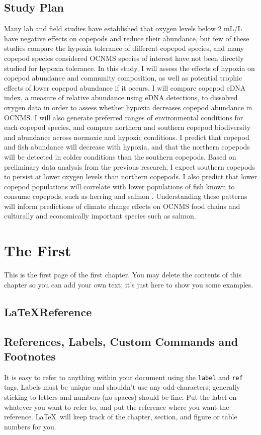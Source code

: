 \documentclass[12pt,twoside]{reedthesis}
\begin{document}
\clearpage 

\section{Study Plan}

Many lab and field studies have established that oxygen levels below 2 mL/L have negative effects on copepods and reduce their abundance, but few of these studies compare the hypoxia tolerance of different copepod species, and many copepod species considered OCNMS species of interest have not been directly studied for hypoxia tolerance. In this study, I will assess the effects of hypoxia on copepod abundance and community composition, as well as potential trophic effects of lower copepod abundance if it occurs. I will compare copepod eDNA index, a measure of relative abundance using eDNA detections, to dissolved oxygen data in order to assess whether hypoxia decreases copepod abundance in OCNMS. I will also generate preferred ranges of environmental conditions for each copepod species, and compare northern and southern copepod biodiversity and abundance across normoxic and hypoxic conditions. I predict that copepod and fish abundance will decrease with hypoxia, and that the northern copepods will be detected in colder conditions than the southern copepods. Based on preliminary data analysis from the previous research, I expect southern copepods to persist at lower oxygen levels than northern copepods. I also predict that lower copepod populations will correlate with lower populations of fish known to consume copepods, such as herring and salmon \autocite{Surma2022, Friedenberg2012, Brodeur1990}. Understanding these patterns will inform predictions of climate change effects on OCNMS food chains and culturally and economically important species such as salmon.
	
    \chapter{The First}
    	This is the first page of the first chapter. You may delete the contents of this chapter so you can add your own text; it's just here to show you some examples. 

   
   \section{\LaTeX Reference}
   
   \section{References, Labels, Custom Commands and Footnotes}
   It is easy to refer to anything within your document using the \texttt{label} and \texttt{ref} tags.  Labels must be unique and shouldn't use any odd characters; generally sticking to letters and numbers (no spaces) should be fine. Put the label on whatever you want to refer to, and put the reference where you want the reference. \LaTeX\ will keep track of the chapter, section, and figure or table numbers for you. 
   
\end{document}
